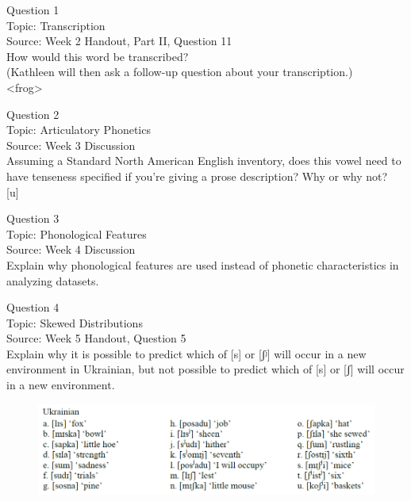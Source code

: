 \documentclass[12pt]{article}
\begin{document}
{\large Question 1}\\

Topic: Transcription\\
Source: Week 2 Handout, Part II, Question 11\\

How would this word be transcribed?\\ (Kathleen will then ask a follow-up question about your transcription.)\\

<frog>


\newpage

{\large Question 2}\\

Topic: Articulatory Phonetics\\
Source: Week 3 Discussion\\

Assuming a Standard North American English inventory, does this vowel need to have tenseness specified if you're giving a prose description? Why or why not?\\

{[u]}


\newpage

{\large Question 3}\\

Topic: Phonological Features\\
Source: Week 4 Discussion\\

Explain why phonological features are used instead of phonetic characteristics in analyzing datasets.\\


\newpage

{\large Question 4}\\

Topic: Skewed Distributions\\
Source: Week 5 Handout, Question 5\\

Explain why it is possible to predict which of [s] or [ʃʲ] will occur in a new environment in Ukrainian, but not possible to predict which of [s] or [ʃ] will occur in a new environment.\\

\begin{figure}[H]
\includegraphics{../images/ukrainian.png}
\end{figure}
\end{document}
